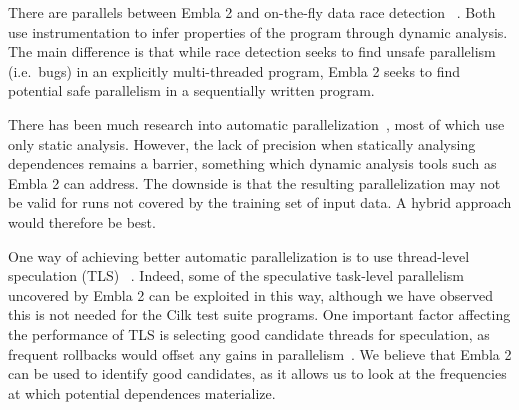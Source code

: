 There are parallels between Embla 2 and on-the-fly data race detection~
\cite{MellorCrummey91onthefly,savage97eraser}.  Both use
instrumentation to infer properties of the program through dynamic
analysis.  The main difference is that while race detection seeks to
find unsafe parallelism (i.e.\ bugs) in an explicitly multi-threaded
program, Embla 2 seeks to find potential safe parallelism in a
sequentially written program.

There has been much research into automatic parallelization~\cite{kennedy02optimizing,Blume94polaris},
most of which use only static analysis.  However,
the lack of precision when statically analysing dependences remains a
barrier, something which dynamic analysis tools such as Embla 2 can address.
The downside is that the resulting parallelization may not be valid
for runs not covered by the training set of input data.
A hybrid approach would therefore be best.

One way of achieving better automatic parallelization is to use
thread-level speculation (TLS)~
\cite{Rundberg01anall-software,gregory05stampede}.
Indeed, some of the speculative
task-level parallelism uncovered by Embla 2 can be exploited in
this way, 
although we have observed this is not needed for the Cilk test suite programs.
One important factor affecting the performance of TLS is
selecting good candidate threads for speculation, as frequent
rollbacks would offset any gains in parallelism~\cite{johnson04mincut,liu06posh}.
We believe that Embla 2 can be used to identify good
candidates, as it allows us to look at the frequencies at which
potential dependences materialize.
